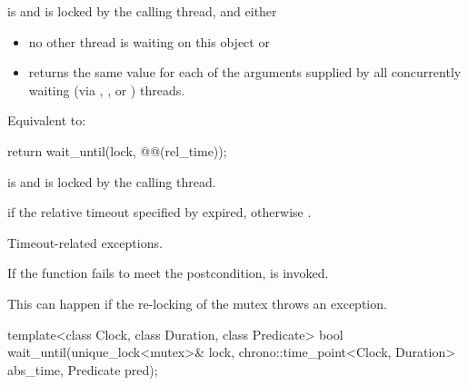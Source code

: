 \begin{itemdescr}
\pnum
\expects
{} is  and 
is locked by the calling thread, and either
\begin{itemize}
\item no other thread is waiting on this  object or
\item {} returns the same value for each of the  arguments
supplied by all concurrently waiting (via , , or
) threads.
\end{itemize}

\pnum
\effects
Equivalent to:
\begin{codeblock}
return wait_until(lock, @@(rel_time));
\end{codeblock}

\pnum
\ensures
{} is  and 
is locked by the calling thread.

\pnum
\returns
{} if
the relative timeout specified by  expired,
otherwise .

\pnum
\throws
Timeout-related
exceptions.

\pnum
\remarks
If the function fails to meet the postcondition, 
is invoked.
\begin{note}
This can happen if the re-locking of the mutex throws an exception.
\end{note}
\end{itemdescr}

%
\begin{itemdecl}
template<class Clock, class Duration, class Predicate>
  bool wait_until(unique_lock<mutex>& lock,
                  chrono::time_point<Clock, Duration> abs_time,
                  Predicate pred);
\end{itemdecl}


